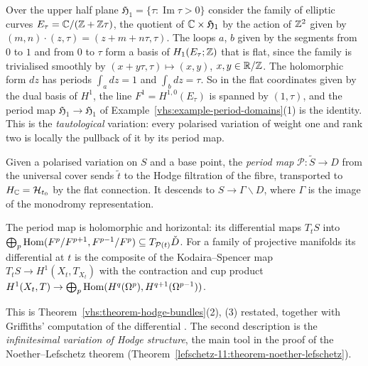 \begin{example}\label{vhs:example-upper-half-plane}
Over the upper half plane $\mathfrak{H}_1 = \{\tau : \operatorname{Im}\tau > 0\}$ consider the family of elliptic curves $E_\tau = \mathbb{C}/(\mathbb{Z} + \mathbb{Z}\tau)$, the quotient of $\mathbb{C} \times \mathfrak{H}_1$ by the action of $\mathbb{Z}^2$
given by $(m, n) \cdot (z, \tau) = (z + m + n\tau, \tau)$. The loops $a$, $b$ given by the segments from $0$ to $1$ and from $0$ to $\tau$ form a basis of $H_1(E_\tau; \mathbb{Z})$ that is flat, since the family is
trivialised smoothly by $(x + y\tau, \tau) \mapsto (x, y)$, $x, y \in \mathbb{R}/\mathbb{Z}$. The holomorphic form $dz$ has periods $\int_adz = 1$ and $\int_bdz = \tau$. So in the flat coordinates given by the dual basis of
$H^1$, the line $F^1 = H^{1,0}(E_\tau)$ is spanned by $(1, \tau)$, and the period map $\mathfrak{H}_1 \to \mathfrak{H}_1$ of Example~\ref{vhs:example-period-domains}(1) is the identity. This is the
\emph{tautological} variation: every polarised variation of weight one and rank two is locally the pullback of it by its period map.
\end{example}

\begin{definition}\label{vhs:definition-period-map}
Given a polarised variation on $S$ and a base point, the \emph{period map} $\mathcal{P} \colon \tilde S \to D$ from the universal cover sends $\tilde t$ to the Hodge filtration of the fibre, transported to
$H_{\mathbb{C}} = \mathcal{H}_{t_0}$ by the flat connection. It descends to $S \to \Gamma\backslash D$, where $\Gamma$ is the image of the monodromy representation.
\end{definition}

\begin{proposition}\label{vhs:proposition-period-map}
The period map is holomorphic and horizontal: its differential maps $T_tS$ into $\bigoplus_p\operatorname{Hom}(F^p/F^{p+1}, F^{p-1}/F^p) \subseteq T_{\mathcal{P}(t)}\check D$. For a family of projective
manifolds its differential at $t$ is the composite of the Kodaira--Spencer map $T_tS \to H^1(X_t, T_{X_t})$ with the contraction and cup product
$H^1(X_t, T) \to \bigoplus_p\operatorname{Hom}(H^q(\Omega^p), H^{q+1}(\Omega^{p-1}))$.
\end{proposition}

This is Theorem~\ref{vhs:theorem-hodge-bundles}(2), (3) restated, together with Griffiths' computation of the differential \cite[Chapter 10]{voisin-hodge-1}. The second description is
the \emph{infinitesimal variation of Hodge structure}, the main tool in the proof of the Noether--Lefschetz theorem (Theorem~\ref{lefschetz-11:theorem-noether-lefschetz}).

